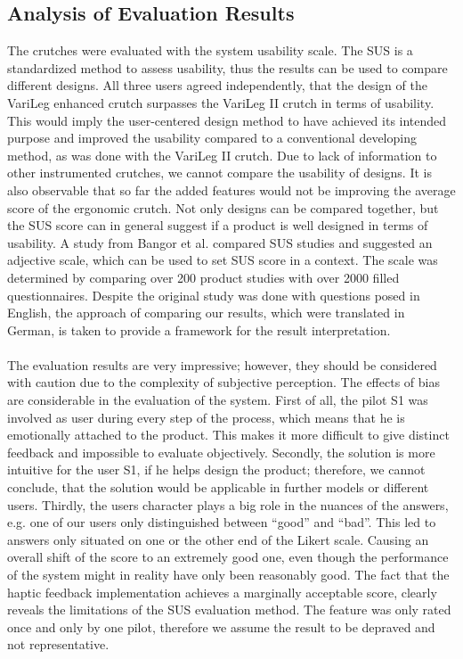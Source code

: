 \documentclass[conference,a4paper]{IEEEtran}
\begin{document}
\subsection{Analysis of Evaluation Results}
The crutches were evaluated with the system usability scale. The SUS is a standardized method to assess usability, thus the results can be used to compare different designs. 
All three users agreed independently, that the design of the VariLeg enhanced crutch surpasses the VariLeg II crutch in terms of usability. This would imply the user-centered design method to have achieved its intended purpose and improved the usability compared to a conventional developing method, as was done with the VariLeg II crutch. Due to lack of information to other instrumented crutches, we cannot compare the usability of designs.
It is also observable that so far the added features would not be improving the average score of the ergonomic crutch.
Not only designs can be compared together, but the SUS score can in general suggest if a product is well designed in terms of usability. A study from Bangor et al. \cite{bangor} compared SUS studies and suggested an adjective scale, which can be used to set SUS score in a context.
The scale was determined by comparing over 200 product studies with over 2000 filled questionnaires. Despite the original study was done with questions posed in English, the approach of comparing our results, which were translated in German, is taken to provide a framework for the result interpretation.\\
\\
The evaluation results are very impressive; however, they should be considered with caution due to the complexity of subjective perception. The effects of bias are considerable in the evaluation of the system. First of all, the pilot S1 was involved as user during every step of the process, which means that he is emotionally attached to the product. This makes it more difficult to give distinct feedback and impossible to evaluate objectively. Secondly, the solution is more intuitive for the user S1, if he helps design the product; therefore, we cannot conclude, that the solution would be applicable in further models or different users. Thirdly, the users character plays a big role in the nuances of the answers, e.g. one of our users only distinguished between “good” and “bad”. This led to answers only situated on one or the other end of the Likert scale. Causing an overall shift of the score to an extremely good one, even though the performance of the system might in reality have only been reasonably good.
The fact that the haptic feedback implementation achieves a marginally acceptable score, clearly reveals the limitations of the SUS evaluation method. The feature was only rated once and only by one pilot, therefore we assume the result to be depraved and not representative.\\
\end{document}
